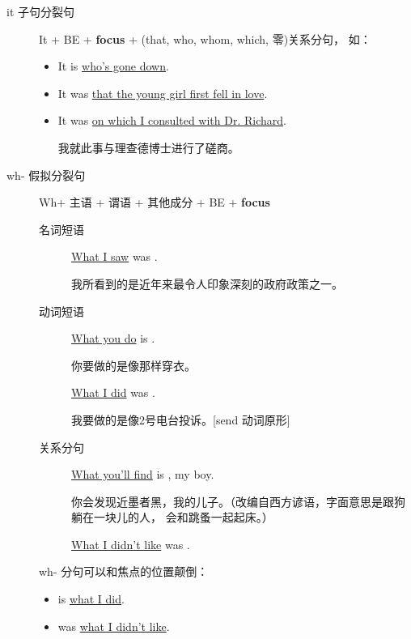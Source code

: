 \begin{description}
\item[it 子句分裂句] It + BE + \textbf{focus} + (that, who, whom, which, 零)关系分句，
  如：
  \begin{itemize}
  \item It is  \uline{who’s gone down}.

  \item It was  \uline{that the young girl first fell in love}.


  \item It was  \uline{on which I consulted with Dr. Richard}.

    我就此事与理查德博士进行了磋商。
  \end{itemize}


\item[wh- 假拟分裂句] Wh+ 主语 + 谓语 + 其他成分 + BE + \textbf{focus}


  \begin{description}
  \item[名词短语] \uline{What I saw} was .

    我所看到的是近年来最令人印象深刻的政府政策之一。
  \item[动词短语] \uline{What you do} is .

    你要做的是像那样穿衣。

   \uline{What I did} was .

   我要做的是像2号电台投诉。[send 动词原形]

 \item[关系分句]
   \uline{What you’ll find} is , my boy.

   你会发现近墨者黑，我的儿子。（改编自西方谚语，字面意思是跟狗躺在一块儿的人，
   会和跳蚤一起起床。）

   \uline{What I didn’t like} was .

  \end{description}

  wh- 分句可以和焦点的位置颠倒：
  \begin{itemize}
  \item {} is \uline{what I did}.

  \item {} was \uline{what I didn’t like}.
  \end{itemize}
\end{description}

